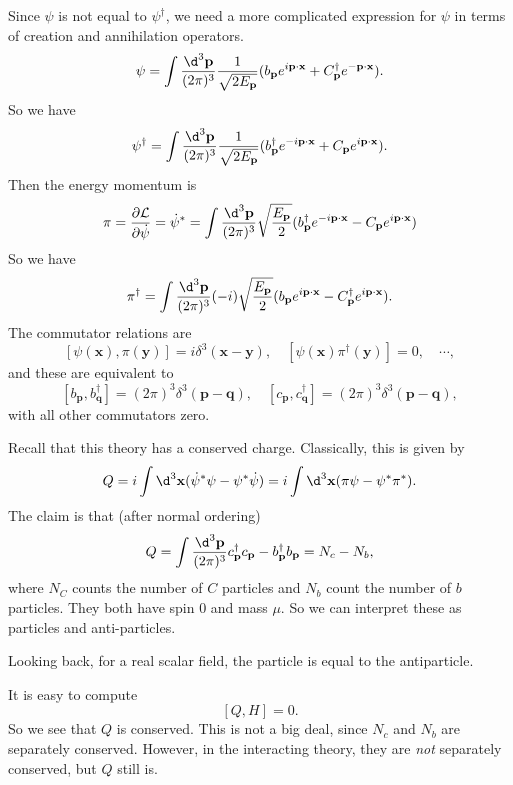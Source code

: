 \documentclass[a4paper]{article}
\begin{document}
Since $\psi$ is not equal to $\psi^\dagger$, we need a more complicated expression for $\psi$ in terms of creation and annihilation operators.
\[
  \psi = \int \frac{\d^3 \mathbf{p}}{(2\pi)^3}\frac{1}{\sqrt{2 E_\mathbf{p}}}(b_\mathbf{p} e^{i \mathbf{p}\cdot \mathbf{x}} + C_\mathbf{p}^\dagger e^{-\mathbf{p}\cdot \mathbf{x}}).
\]
So we have
\[
  \psi^\dagger = \int \frac{\d^3 \mathbf{p}}{(2\pi)^3} \frac{1}{\sqrt{2E_\mathbf{p}}} (b_\mathbf{p}^\dagger e^{-i\mathbf{p}\cdot \mathbf{x}} + C_\mathbf{p} e^{i\mathbf{p}\cdot \mathbf{x}}).
\]
Then the energy momentum is
\[
  \pi = \frac{\partial \mathcal{L}}{\partial \dot{\psi}} = \dot{\psi}^* = \int \frac{\d^3 \mathbf{p}}{(2\pi)^3} \sqrt{\frac{E_\mathbf{p}}{2}} (b_\mathbf{p}^\dagger e^{-i\mathbf{p}\cdot \mathbf{x}} - C_\mathbf{p}e^{i\mathbf{p}\cdot \mathbf{x}})
\]
So we have
\[
  \pi^\dagger = \int \frac{\d^3 \mathbf{p}}{(2\pi)^3}(-i) \sqrt{\frac{E_\mathbf{p}}{2}} (b_\mathbf{p} e^{i\mathbf{p}\cdot \mathbf{x}} - C_\mathbf{p}^\dagger e^{i\mathbf{p}\cdot \mathbf{x}}).
\]
The commutator relations are
\[
  [\psi(\mathbf{x}), \pi(\mathbf{y})] = i \delta^3(\mathbf{x} - \mathbf{y}),\quad [\psi(\mathbf{x}) \pi^\dagger(\mathbf{y})] = 0,\quad\cdots,
\]
and these are equivalent to
\[
  [b_\mathbf{p}, b_\mathbf{q}^\dagger] = (2\pi)^3 \delta^3(\mathbf{p} - \mathbf{q}),\quad [c_\mathbf{p}, c_\mathbf{q}^\dagger] = (2\pi)^3 \delta^3(\mathbf{p} - \mathbf{q}),
\]
with all other commutators zero.

Recall that this theory has a conserved charge. Classically, this is given by
\[
  Q = i \int \d^3 \mathbf{x} (\dot{\psi}^* \psi - \psi^* \dot{\psi}) = i \int \d^3 \mathbf{x} (\pi \psi - \psi^* \pi^*).
\]
The claim is that (after normal ordering)
\[
  Q = \int \frac{\d^3 \mathbf{p}}{(2\pi)^3} c_\mathbf{p}^\dagger c_\mathbf{p} - b_\mathbf{p}^\dagger b_\mathbf{p} = N_c - N_b,
\]
where $N_C$ counts the number of $C$ particles and $N_b$ count the number of $b$ particles. They both have spin $0$ and mass $\mu$. So we can interpret these as particles and anti-particles.

Looking back, for a real scalar field, the particle is equal to the antiparticle.

It is easy to compute
\[
  [Q, H] = 0.
\]
So we see that $Q$ is conserved. This is not a big deal, since $N_c$ and $N_b$ are separately conserved. However, in the interacting theory, they are \emph{not} separately conserved, but $Q$ still is.
\end{document}
